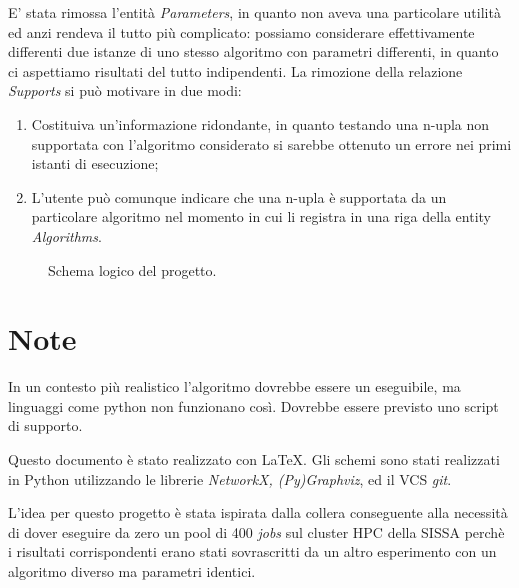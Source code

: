 \documentclass{article}
\begin{document}
E' stata rimossa l'entità \emph{Parameters}, in quanto non aveva una particolare utilità ed anzi rendeva il tutto più complicato: possiamo considerare effettivamente differenti due istanze di uno stesso algoritmo con parametri differenti, in quanto ci aspettiamo risultati del tutto indipendenti. La rimozione della relazione \emph{Supports} si può motivare in due modi:
\begin{enumerate}
    \item Costituiva un'informazione ridondante, in quanto testando una n-upla non supportata con l'algoritmo considerato si sarebbe ottenuto un errore nei primi istanti di esecuzione;
    \item L'utente può comunque indicare che una n-upla è supportata da un particolare algoritmo nel momento in cui li registra in una riga della entity \emph{Algorithms}.
\end{enumerate}
\begin{figure}[H]
    \caption{Schema logico del progetto.}
\end{figure}

\section{Note}
In un contesto più realistico l'algoritmo dovrebbe essere un eseguibile, ma linguaggi come python non funzionano così. Dovrebbe essere previsto uno script di supporto.

Questo documento è stato realizzato con \LaTeX. Gli schemi sono stati realizzati in Python utilizzando le librerie \emph{NetworkX, (Py)Graphviz}, ed il VCS \emph{git}.

L'idea per questo progetto è stata ispirata dalla collera conseguente alla necessità di dover eseguire da zero un pool di 400 \emph{jobs} sul cluster HPC della SISSA perchè i risultati corrispondenti erano stati sovrascritti da un altro esperimento con un algoritmo diverso ma parametri identici.
\end{document}
